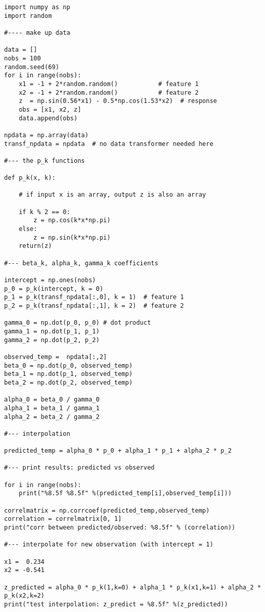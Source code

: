 \documentclass[oneside,10pt]{book}
\begin{document}
\begin{lstlisting}
import numpy as np
import random

#---- make up data

data = []
nobs = 100 
random.seed(69)
for i in range(nobs):
    x1 = -1 + 2*random.random()           # feature 1
    x2 = -1 + 2*random.random()           # feature 2
    z  = np.sin(0.56*x1) - 0.5*np.cos(1.53*x2)  # response
    obs = [x1, x2, z]
    data.append(obs)

npdata = np.array(data)
transf_npdata = npdata  # no data transformer needed here

#--- the p_k functions 

def p_k(x, k):

    # if input x is an array, output z is also an array

    if k % 2 == 0:
        z = np.cos(k*x*np.pi)
    else: 
        z = np.sin(k*x*np.pi)
    return(z)

#--- beta_k, alpha_k, gamma_k coefficients

intercept = np.ones(nobs)   
p_0 = p_k(intercept, k = 0)
p_1 = p_k(transf_npdata[:,0], k = 1)  # feature 1
p_2 = p_k(transf_npdata[:,1], k = 2)  # feature 2 

gamma_0 = np.dot(p_0, p_0) # dot product
gamma_1 = np.dot(p_1, p_1)
gamma_2 = np.dot(p_2, p_2)

observed_temp =  npdata[:,2] 
beta_0 = np.dot(p_0, observed_temp)
beta_1 = np.dot(p_1, observed_temp)
beta_2 = np.dot(p_2, observed_temp)

alpha_0 = beta_0 / gamma_0
alpha_1 = beta_1 / gamma_1
alpha_2 = beta_2 / gamma_2

#--- interpolation 

predicted_temp = alpha_0 * p_0 + alpha_1 * p_1 + alpha_2 * p_2 

#--- print results: predicted vs observed

for i in range(nobs):
    print("%8.5f %8.5f" %(predicted_temp[i],observed_temp[i]))

correlmatrix = np.corrcoef(predicted_temp,observed_temp)
correlation = correlmatrix[0, 1]
print("corr between predicted/observed: %8.5f" % (correlation))

#--- interpolate for new observation (with intercept = 1)

x1 =  0.234
x2 = -0.541

z_predicted = alpha_0 * p_k(1,k=0) + alpha_1 * p_k(x1,k=1) + alpha_2 * p_k(x2,k=2)
print("test interpolation: z_predict = %8.5f" %(z_predicted))
\end{lstlisting}
\end{document}
